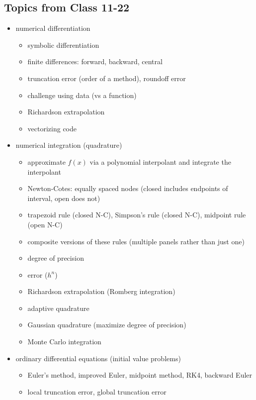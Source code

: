 \documentclass[12pt,letterpaper,noanswers]{exam}
\begin{document}
\subsection*{Topics from Class 11-22}
\begin{itemize}
\itemsep0pt
    \item numerical differentiation
    \begin{itemize}
    \itemsep0pt
        \item symbolic differentiation
        \item finite differences: forward, backward, central
        \item truncation error (order of a method), roundoff error
        \item challenge using data (vs a function)
        \item Richardson extrapolation
        \item vectorizing code
    \end{itemize}
    \item numerical integration (quadrature)
    \begin{itemize}
    \itemsep0pt
        \item approximate $f(x)$ via a polynomial interpolant and integrate the interpolant
        \item Newton-Cotes: equally spaced nodes (closed includes endpoints of interval, open does not)
        \item trapezoid rule (closed N-C), Simpson's rule (closed N-C), midpoint rule (open N-C)
        \item composite versions of these rules (multiple panels rather than just one)
        \item degree of precision
        \item error ($h^n$)
        \item Richardson extrapolation (Romberg integration)
        \item adaptive quadrature
        \item Gaussian quadrature (maximize degree of precision)
        \item Monte Carlo integration
    \end{itemize}
    \item ordinary differential equations (initial value problems)
    \begin{itemize}
    \itemsep0pt
        \item Euler's method, improved Euler, midpoint method, RK4, backward Euler
        \item local truncation error, global truncation error

\end{itemize}
\end{itemize}
\end{document}
